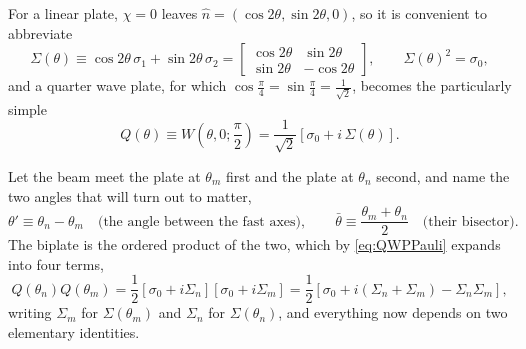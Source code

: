             For a linear plate, $\chi=0$ leaves $\hat n=\left(\cos2\theta,\sin2\theta,0\right)$, so it is convenient to abbreviate
            \begin{equation}\label{eq:SigmaDef}
                \Sigma(\theta) \equiv \cos2\theta\,\sigma_1+\sin2\theta\,\sigma_2 = \begin{bmatrix}\cos2\theta & \sin2\theta \\ \sin2\theta & -\cos2\theta\end{bmatrix}, \qquad \Sigma(\theta)^2=\sigma_0,
            \end{equation}
            and a quarter wave plate, for which $\cos\frac\pi4=\sin\frac\pi4=\frac{1}{\sqrt2}$, becomes the particularly simple
            \begin{equation}\label{eq:QWPPauli}
                Q(\theta) \equiv W\left(\theta,0;\frac{\pi}{2}\right) = \frac{1}{\sqrt{2}}\left[\sigma_0+i\,\Sigma(\theta)\right].
            \end{equation}

            Let the beam meet the plate at $\theta_m$ first and the plate at $\theta_n$ second, and name the two angles that will turn out to matter,
            \begin{equation}\label{eq:BiplateAngles}
                \theta' \equiv \theta_n-\theta_m \quad\text{(the angle between the fast axes)}, \qquad \bar{\theta} \equiv \frac{\theta_m+\theta_n}{2} \quad\text{(their bisector)} .
            \end{equation}
            The biplate is the ordered product of the two, which by \ref{eq:QWPPauli} expands into four terms,
            \begin{equation}\label{eq:BiplateExpand}
                Q(\theta_n)Q(\theta_m) = \frac{1}{2}\left[\sigma_0+i\Sigma_n\right]\left[\sigma_0+i\Sigma_m\right] = \frac{1}{2}\left[\sigma_0+i\left(\Sigma_n+\Sigma_m\right)-\Sigma_n\Sigma_m\right],
            \end{equation}
            writing $\Sigma_m$ for $\Sigma(\theta_m)$ and $\Sigma_n$ for $\Sigma(\theta_n)$, and everything now depends on two elementary identities.

